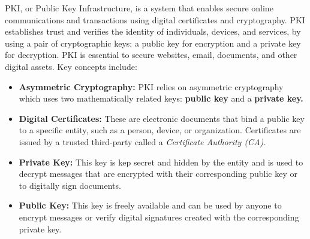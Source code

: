  PKI, or Public Key Infrastructure, is a system that enables secure online communications and transactions using digital certificates and cryptography. PKI establishes trust and verifies the identity of individuals, devices, and services, by using a pair of cryptographic keys: a public key for encryption and a private key for decryption. PKI is essential to secure websites, email, documents, and other digital assets. Key concepts include:
\begin{itemize}
\item \textbf{Asymmetric Cryptography:} PKI relies on asymmetric cryptography which uses two mathematically related keys: \textbf{public key} and a \textbf{private key.}
\item \textbf{Digital Certificates:} These are electronic documents that bind a public key to a specific entity, such as a person, device, or organization. Certificates are issued by a trusted third-party called a \textit{Certificate Authority (CA).}
\item \textbf{Private Key:} This key is kep secret and hidden by the entity and is used to decrypt messages that are encrypted with their corresponding public key or to digitally sign documents.
\item \textbf{Public Key:} This key is freely available and can be used by anyone to encrypt messages or verify digital signatures created with the corresponding private key.
\end{itemize}

